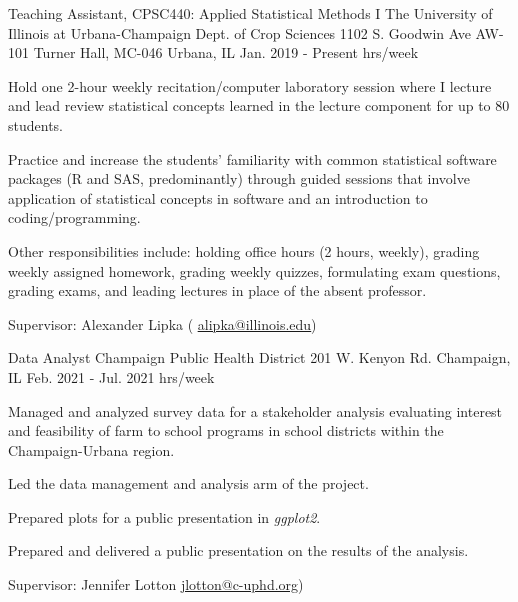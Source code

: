 \begin{cventries}
  \cventry
    {Teaching Assistant, CPSC440: Applied Statistical Methods I} %
    {The University of Illinois at Urbana-Champaign \newline Dept. of Crop Sciences } %
    {1102 S. Goodwin Ave \newline AW-101 Turner Hall, MC-046
    Urbana, IL} %
    {Jan. 2019 - Present  hrs/week} %
    {
      \begin{cvitems} %
        \item {Hold one 2-hour weekly recitation/computer laboratory session where I lecture and lead review statistical concepts learned in the lecture component for up to 80 students.}
        \item {Practice and increase the students’ familiarity with common statistical software packages (R and SAS, predominantly) through guided sessions that involve application of statistical concepts in software and an introduction to coding/programming.}
        \item {Other responsibilities include: holding office hours (2 hours, weekly), grading weekly assigned homework, grading weekly quizzes, formulating exam questions, grading exams, and leading lectures in place of the absent professor.}
        \item {Supervisor: Alexander Lipka ( \textcolor{navyblue}{\underline{\href{mailto:alipka@illinois.edu}{alipka@illinois.edu}}})}
      \end{cvitems}
    }

  \cventry
    {Data Analyst}%
    {Champaign Public Health District } %
    {201 W. Kenyon Rd. \newline
    Champaign, IL} %
    {Feb. 2021 - Jul. 2021  hrs/week} %
    {
      \begin{cvitems} %
        \item {Managed and analyzed survey data for a stakeholder analysis evaluating interest and feasibility of farm to school programs in school districts within the Champaign-Urbana region.}
        \item{Led the data management and analysis arm of the project.}
        \item{Prepared plots for a public presentation in \textit{ggplot2}.}
        \item{Prepared and delivered a public presentation on the results of the analysis.}
        \item {Supervisor: Jennifer Lotton \textcolor{navyblue}{\underline{\href{mailto:jlotton@c-uphd.org}{jlotton@c-uphd.org}}})}
      \end{cvitems}
    }


\end{cventries}
